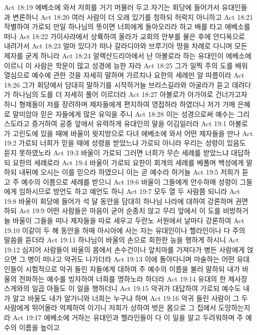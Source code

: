 Act 18:19  에베소에 와서 저희를 거기 머물러 두고 자기는 회당에 들어가서 유대인들과 변론하니
Act 18:20  여러 사람이 더 오래 있기를 청하되 허락지 아니하고
Act 18:21  작별하여 가로되 만일 하나님의 뜻이면 너희에게 돌아오리라 하고 배를 타고 에베소를 떠나
Act 18:22  가이사랴에서 상륙하여 올라가 교회의 안부를 물은 후에 안디옥으로 내려가서
Act 18:23  얼마 있다가 떠나 갈라디아와 브루기아 땅을 차례로 다니며 모든 제자를 굳게 하니라
Act 18:24  알렉산드리아에서 난 아볼로라 하는 유대인이 에베소에 이르니 이 사람은 학문이 많고 성경에 능한 자라
Act 18:25  그가 일찍 주의 도를 배워 열심으로 예수에 관한 것을 자세히 말하며 가르치나 요한의 세례만 알 따름이라
Act 18:26  그가 회당에서 담대히 말하기를 시작하거늘 브리스길라와 아굴라가 듣고 데려다가 하나님의 도를 더 자세히 풀어 이르더라
Act 18:27  아볼로가 아가야로 건너가고자 하니 형제들이 저를 장려하며 제자들에게 편지하여 영접하라 하였더니 저가 가매 은혜로 말미암아 믿은 자들에게 많은 유익을 주니
Act 18:28  이는 성경으로써 예수는 그리스도라고 증거하여 공중 앞에서 유력하게 유대인의 말을 이김일러라
Act 19:1  아볼로가 고린도에 있을 때에 바울이 윗지방으로 다녀 에베소에 와서 어떤 제자들을 만나
Act 19:2  가로되 너희가 믿을 때에 성령을 받았느냐 가로되 아니라 우리는 성령이 있음도 듣지 못하였노라
Act 19:3  바울이 가로되 그러면 너희가 무슨 세례를 받았느냐 대답하되 요한의 세례로라
Act 19:4  바울이 가로되 요한이 회개의 세례를 베풀며 백성에게 말하되 내뒤에 오시는 이를 믿으라 하였으니 이는 곧 예수라 하거늘
Act 19:5  저희가 듣고 주 예수의 이름으로 세례를 받으니
Act 19:6  바울이 그들에게 안수하매 성령이 그들에게 임하시므로 방언도 하고 예언도 하니
Act 19:7  모두 열 두 사람쯤 되니라
Act 19:8  바울이 회당에 들어가 석 달 동안을 담대히 하나님 나라에 대하여 강론하며 권면하되
Act 19:9  어떤 사람들은 마음이 굳어 순종치 않고 무리 앞에서 이 도를 비방하거늘 바울이 그들을 떠나 제자들을 따로 세우고 두란노 서원에서 날마다 강론하여
Act 19:10  이같이 두 해 동안을 하매 아시아에 사는 자는 유대인이나 헬라인이나 다 주의 말씀을 듣더라
Act 19:11  하나님이 바울의 손으로 희한한 능을 행하게 하시니
Act 19:12  심지어 사람들이 바울의 몸에서 손수건이나 앞치마를 가져다가 병든 사람에게 얹으면 그 병이 떠나고 악귀도 나가더라
Act 19:13  이에 돌아다니며 마술하는 어떤 유대인들이 시험적으로 악귀 들린 자들에게 대하여 주 예수의 이름을 불러 말하되 내가 바울의 전파하는 예수를 빙자하여 너희를 명하노라 하더라
Act 19:14  유대의 한 제사장 스게와의 일곱 아들도 이 일을 행하더니
Act 19:15  악귀가 대답하여 가로되 예수도 내가 알고 바울도 내가 알거니와 너희는 누구냐 하며
Act 19:16  악귀 들린 사람이 그 두사람에게 뛰어올라 억제하여 이기니 저희가 상하여 벗은 몸으로 그 집에서 도망하는지라
Act 19:17  에베소에 거하는 유대인과 헬라인들이 다 이 일을 알고 두려워하며 주 예수의 이름을 높이고

